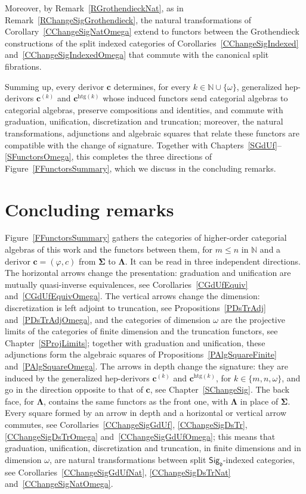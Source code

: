 \documentclass[a4paper, reqno]{amsbook}
\newcommand{\sig}[1]{\mathbf{#1}}             %
\newcommand{\htg}{\mathrm{htg}}                %
\theoremstyle{plain}
\theoremstyle{definition}
\begin{document}
Moreover, by Remark~\ref{RGrothendieckNat}, as in Remark~\ref{RChangeSigGrothendieck}, the natural transformations of Corollary~\ref{CChangeSigNatOmega} extend to functors between the Grothendieck constructions of the split indexed categories of Corollaries~\ref{CChangeSigIndexed} and~\ref{CChangeSigIndexedOmega} that commute with the canonical split fibrations.

Summing up, every derivor $\mathbf{c}$ determines, for every $k\in\mathbb{N}\cup\{\omega\}$, generalized hep-derivors $\mathbf{c}^{(k)}$ and $\mathbf{c}^{\htg(k)}$ whose induced functors send categorial algebras to categorial algebras, preserve compositions and identities, and commute with graduation, unification, discretization and truncation; moreover, the natural transformations, adjunctions and algebraic squares that relate these functors are compatible with the change of signature.
Together with Chapters~\ref{SGdUf}--\ref{SFunctorsOmega}, this completes the three directions of Figure~\ref{FFunctorsSummary}, which we discuss in the concluding remarks.


\chapter*{Concluding remarks}

Figure~\ref{FFunctorsSummary} gathers the categories of higher-order categorial algebras of this work and the functors between them, for $m\leq n$ in $\mathbb{N}$ and a derivor $\mathbf{c}=(\varphi,c)$ from $\sig{\Sigma}$ to $\sig{\Lambda}$.
It can be read in three independent directions.
The horizontal arrows change the presentation: graduation and unification are mutually quasi-inverse equivalences, see Corollaries~\ref{CGdUfEquiv} and~\ref{CGdUfEquivOmega}.
The vertical arrows change the dimension: discretization is left adjoint to truncation, see Propositions~\ref{PDsTrAdj} and~\ref{PDsTrAdjOmega}, and the categories of dimension $\omega$ are the projective limits of the categories of finite dimension and the truncation functors, see Chapter~\ref{SProjLimits}; together with graduation and unification, these adjunctions form the algebraic squares of Propositions~\ref{PAlgSquareFinite} and~\ref{PAlgSquareOmega}.
The arrows in depth change the signature: they are induced by the generalized hep-derivors $\mathbf{c}^{(k)}$ and $\mathbf{c}^{\htg(k)}$, for $k\in\{m,n,\omega\}$, and go in the direction opposite to that of $\mathbf{c}$, see Chapter~\ref{SChangeSig}.
The back face, for $\sig{\Lambda}$, contains the same functors as the front one, with $\sig{\Lambda}$ in place of $\sig{\Sigma}$.
Every square formed by an arrow in depth and a horizontal or vertical arrow commutes, see Corollaries~\ref{CChangeSigGdUf}, \ref{CChangeSigDsTr}, \ref{CChangeSigDsTrOmega} and~\ref{CChangeSigGdUfOmega}; this means that graduation, unification, discretization and truncation, in finite dimensions and in dimension $\omega$, are natural transformations between split $\mathsf{Sig}_{\mathfrak{d}}$-indexed categories, see Corollaries~\ref{CChangeSigGdUfNat}, \ref{CChangeSigDsTrNat} and~\ref{CChangeSigNatOmega}.
\end{document}
